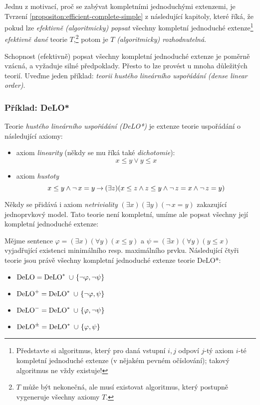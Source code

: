 \begin{remark}
    Jednu z motivací, proč se zabývat kompletními jednoduchými extenzemi, je Tvrzení \ref{propositon:efficient-complete-simple} z následující kapitoly, které říká, že pokud lze \emph{efektivně (algoritmicky) popsat} všechny kompletní jednoduché extenze\footnote{Představte si algoritmus, který pro daná vstupní $i,j$ odpoví $j$-tý axiom $i$-té kompletní jednoduché extenze (v nějakém pevném očíslování); takový algoritmus ne vždy existuje!} \emph{efektivně dané} teorie $T$,\footnote{$T$ může být nekonečná, ale musí existovat algoritmus, který postupně vygeneruje všechny axiomy $T$.} potom je $T$ \emph{(algoritmicky) rozhodnutelná}.
\end{remark}


Schopnost (efektivně) popsat všechny kompletní jednoduché extenze je poměrně vzácná, a vyžaduje silné předpoklady. Přesto to lze provést u mnoha důležitých teorií. Uveďme jeden příklad: \emph{teorii hustého lineárního uspořádání (dense linear order)}.

\subsubsection{Příklad: DeLO*}

Teorie \emph{hustého lineárního uspořádání (DeLO*)}  je extenze teorie uspořádání o následující axiomy: 
\begin{itemize}
    \item axiom \emph{linearity} (někdy se mu říká také \emph{dichotomie}):
    $$
    x\leq y\lor y\leq x
    $$
    \item axiom \emph{hustoty}
    $$
    {x\leq y}\land{\neg\,x=y}\mathbin{\rightarrow}(\exists z)(x\leq z\land z\leq y\land\neg\,z=x\land\neg\,z=y)
    $$
\end{itemize}
Někdy se přidává i axiom \emph{netriviality} $(\exists x)(\exists y)(\neg\,x=y)$ zakazující jednoprvkový model. Tato teorie není kompletní, umíme ale popsat všechny její kompletní jednoduché extenze:

\begin{proposition}
Mějme sentence $\varphi=(\exists x)(\forall y)(x\leq y)$ a $\psi=(\exists x)(\forall y)(y\leq x)$ vyjadřující existenci minimálního resp. maximálního prvku. Následující čtyři teorie jsou právě všechny kompletní jednoduché extenze teorie DeLO*:
\begin{itemize}
    \item $\operatorname{DeLO} = \operatorname{DeLO}^*\ \cup \ \{\neg\varphi
    ,\neg\psi\}$
    \item $\DeLO^+ = \DeLO^*\ \cup \ \{\neg\varphi
    ,\psi\}$
    \item $\operatorname{DeLO}^- = \operatorname{DeLO}^*\ \cup \ \{\varphi
    ,\neg\psi\}$
    \item $\operatorname{DeLO}^\pm = \operatorname{DeLO}^*\ \cup \ \{\varphi
    ,\psi\}$        
\end{itemize}
\end{proposition}

